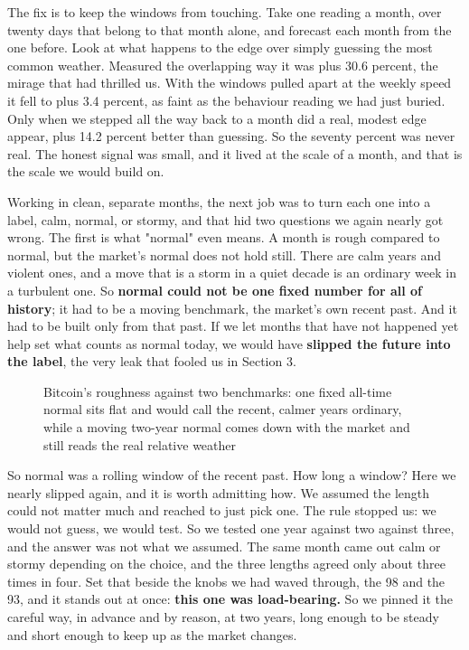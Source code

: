 \documentclass[11pt]{article} %
\begin{document}
The fix is to keep the windows from touching. Take one reading a month, over twenty days that belong to that month alone, and forecast each month from the one before. Look at what happens to the edge over simply guessing the most common weather. Measured the overlapping way it was plus 30.6 percent, the mirage that had thrilled us. With the windows pulled apart at the weekly speed it fell to plus 3.4 percent, as faint as the behaviour reading we had just buried. Only when we stepped all the way back to a month did a real, modest edge appear, plus 14.2 percent better than guessing. So the seventy percent was never real. The honest signal was small, and it lived at the scale of a month, and that is the scale we would build on.

Working in clean, separate months, the next job was to turn each one into a label, calm, normal, or stormy, and that hid two questions we again nearly got wrong. The first is what "normal" even means. A month is rough compared to normal, but the market's normal does not hold still. There are calm years and violent ones, and a move that is a storm in a quiet decade is an ordinary week in a turbulent one. So \textbf{normal could not be one fixed number for all of history}; it had to be a moving benchmark, the market's own recent past. And it had to be built only from that past. If we let months that have not happened yet help set what counts as normal today, we would have \textbf{slipped the future into the label}, the very leak that fooled us in Section 3.

\begin{figure}[htbp]
\centering

\caption{Bitcoin's roughness against two benchmarks: one fixed all-time normal sits flat and would call the recent, calmer years ordinary, while a moving two-year normal comes down with the market and still reads the real relative weather}
\end{figure}


So normal was a rolling window of the recent past. How long a window? Here we nearly slipped again, and it is worth admitting how. We assumed the length could not matter much and reached to just pick one. The rule stopped us: we would not guess, we would test. So we tested one year against two against three, and the answer was not what we assumed. The same month came out calm or stormy depending on the choice, and the three lengths agreed only about three times in four. Set that beside the knobs we had waved through, the 98 and the 93, and it stands out at once: \textbf{this one was load-bearing.} So we pinned it the careful way, in advance and by reason, at two years, long enough to be steady and short enough to keep up as the market changes.
\end{document}
